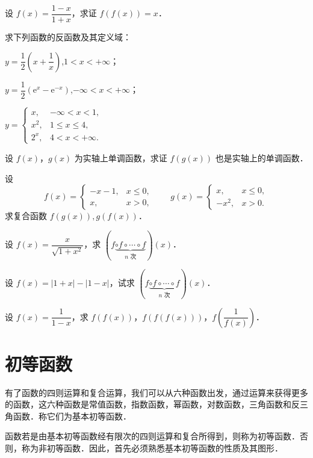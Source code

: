 \begin{xiti}
\item 设 $f(x)=\dfrac{1-x}{1+x}$，求证 $f(f(x))=x$．
\item 求下列函数的反函数及其定义域：
  \begin{ziti}
  \item $y=\dfrac{1}{2}\left(x+\dfrac{1}{x}\right)$,\quad $1<x<+\infty$；
  \item $y=\dfrac{1}{2}(\mathrm{e}^x-\mathrm{e}^{-x})$,\quad $-\infty<x<+\infty$；
  \item $y=\begin{cases}
  x, & -\infty<x<1,\\
  x^2, & 1\leqslant x\leqslant 4,\\
  2^x, & 4<x<+\infty.
  \end{cases}$
  \end{ziti}
\item 设 $f(x)$，$g(x)$ 为实轴上单调函数，求证 $f(g(x))$ 也是实轴上的单调函数．
\item 设
\[
f(x)=\begin{cases}
-x-1, & x\leqslant0,\\
x, & x>0,
\end{cases}\qquad g(x)=\begin{cases}
x, & x\leqslant0,\\
-x^2, & x>0.
\end{cases}
\]
求复合函数 $f(g(x)), g(f(x))$．
\item 设 $f(x)=\dfrac{x}{\sqrt{1+x^2}}$，求 $(f\underbrace{\circ f\circ\cdots\circ f}_{n\text{ 次}})(x)$．
\item 设 $f(x)=|1+x|-|1-x|$，试求 $(f\underbrace{\circ f\circ\cdots\circ f}_{n\text{ 次}})(x)$．
\item 设 $f(x)=\dfrac{1}{1-x}$，求 $f(f(x))$，$f(f(f(x)))$，$f\left(\dfrac{1}{f(x)}\right)$．
\end{xiti}

\section{初等函数}\label{sec:2.3}

有了函数的四则运算和复合运算，我们可以从六种函数出发，通过运算来获得更多的函数，这六种函数是常值函数，指数函数，幂函数，对数函数，三角函数和反三角函数．称它们为基本初等函数．

函数若是由基本初等函数经有限次的四则运算和复合所得到，则称为初等函数．否则，称为非初等函数．因此，首先必须熟悉基本初等函数的性质及其图形．

